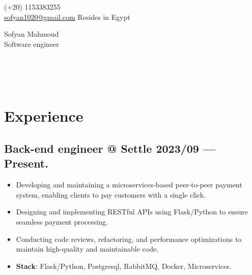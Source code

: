\documentclass[a4,10pt]{article}
\newenvironment{zitemize}{
\begin{itemize}\itemsep0pt \parskip0pt \parsep1pt}
{\end{itemize}\vspace{-0.5cm}}
\begin{document}
\begin{center}
    \begin{minipage}[b]{0.24\textwidth}
            \large (+20) 1153383255 \\
            \large \href{mailto:sofyan1020@gmail.com}{sofyan1020@gmail.com} 
            \large Resides in Egypt
    \end{minipage}%
    \begin{minipage}[b]{0.5\textwidth}
            \centering
            {\Huge Sofyan Mahmoud} \\ %
            \vspace{0.1cm}
            {\color{UI_blue} \Large{Software engineer}} \\
    \end{minipage}%
    \begin{minipage}[b]{0.14\textwidth}
            \flushright \large  %
            \href{https://www.linkedin.com/in/sofyanmahmoud0000/}{\color{blue}{LinkedIn} } \\
            \href{https://leetcode.com/u/sofyan1020/}{\color{blue}{Leetcode}} \\ 
            \href{https://github.com/sofyanmahmoud0000}{\color{blue}{Github}} \\ 
    \end{minipage}   
    
\vspace{-0.15cm} 
\end{center}
\vspace{-0.25cm}


\section{Experience}

\subsection*{Back-end engineer @ Settle \hfill 2023/09 --- Present.} 
    \begin{zitemize}
        \item Developing and maintaining a microservices-based peer-to-peer payment system, enabling clients to pay customers with a single click.
        \item Designing and implementing RESTful APIs using Flask/Python to ensure seamless payment processing.
        \item Conducting code reviews, refactoring, and performance optimizations to maintain high-quality and maintainable code.

        \item \textbf{Stack}: Flask/Python, Postgresql, RabbitMQ, Docker, Microservices.
    \end{zitemize}
\end{document}
